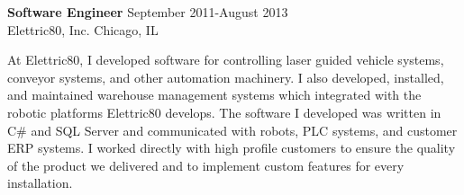 \textbf{Software Engineer} \hfill September 2011-August 2013 \\
Elettric80, Inc. \hfill Chicago, IL
\begin{description}  \itemsep -2pt %
\item At Elettric80, I developed software for controlling laser guided
vehicle systems, conveyor systems, and other automation machinery. I also
developed, installed, and maintained warehouse management systems which
integrated with the robotic platforms Elettric80 develops. The software I
developed was written in C\# and SQL Server and communicated with robots,
PLC systems, and customer ERP systems. I worked directly with high profile
customers to ensure the quality of the product we delivered and to implement
custom features for every installation.
\end{description}
